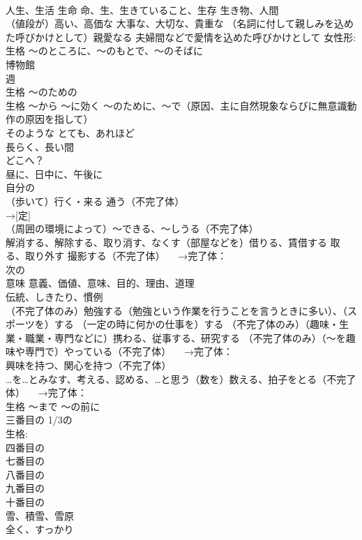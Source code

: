 \documentclass[8pt]{extreport}
\begin{document}
\begin{CJK}{UTF8}{min}
\\	人生、生活 生命 命、生、生きていること、生存 生き物、人間
\\	（値段が）高い、高価な 大事な、大切な、貴重な （名詞に付して親しみを込めた呼びかけとして）親愛なる 夫婦間などで愛情を込めた呼びかけとして 女性形:
\\	生格	～のところに、～のもとで、～のそばに
\\	博物館
\\	週
\\	生格	～のための
\\	生格	～から 〜に効く 〜のために、〜で（原因、主に自然現象ならびに無意識動作の原因を指して）
\\	そのような とても、あれほど
\\	長らく、長い間
\\	どこへ？
\\	昼に、日中に、午後に
\\	自分の
\\	[不定]（歩いて）行く・来る 通う（不完了体） 
\\	→[定]
\\	（周囲の環境によって）～できる、～しうる（不完了体） 
\\	解消する、解除する、取り消す、なくす（部屋などを）借りる、賃借する 取る、取り外す 撮影する（不完了体） 　→完了体：
\\	次の
\\	意味 意義、価値、意味、目的、理由、道理
\\	伝統、しきたり、慣例
\\	（不完了体のみ）勉強する（勉強という作業を行うことを言うときに多い）、（スポーツを）する （一定の時に何かの仕事を）する （不完了体のみ）（趣味・生業・職業・専門などに）携わる、従事する、研究する （不完了体のみ）（～を趣味や専門で）やっている（不完了体） 　→完了体：
\\	興味を持つ、関心を持つ（不完了体）
\\	…を…とみなす、考える、認める、…と思う（数を）数える、拍子をとる（不完了体） 　→完了体：
\\	生格	～まで ～の前に
\\	[序]三番目の 1/3の 
\\	生格:
\\	[序]四番目の
\\	[序]七番目の
\\	[序]八番目の
\\	[序]九番目の
\\	[序]十番目の
\\	雪、積雪、雪原
\\	全く、すっかり

\end{CJK}
\end{document}
